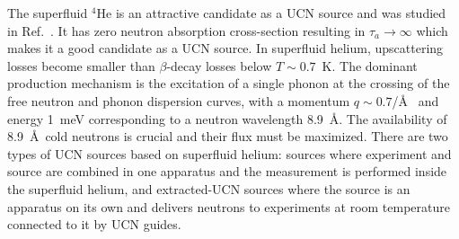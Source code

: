 The superfluid $^4$He is an attractive candidate as a UCN source and
was studied in Ref.~\cite{Golub77}.  It has zero neutron absorption
cross-section resulting in $\tau_a \rightarrow \infty$ which makes it
a good candidate as a UCN source.  In superfluid helium, upscattering
losses become smaller than $\beta$-decay losses below $T \sim 0.7$~K.
The dominant production mechanism is the excitation of a single phonon
at the crossing of the free neutron and phonon dispersion curves, with
a momentum $q\sim 0.7$/\AA~\cite{Brome2001} and energy 1~meV
corresponding to a neutron wavelength 8.9~\AA. The availability of
8.9~\AA~cold neutrons is crucial and their flux must be maximized.
There are two types of UCN sources based on superfluid helium: sources
where experiment and source are combined in one apparatus and the
measurement is performed inside the superfluid helium, and
extracted-UCN sources where the source is an apparatus on its own and
delivers neutrons to experiments at room temperature connected to it
by UCN guides.




